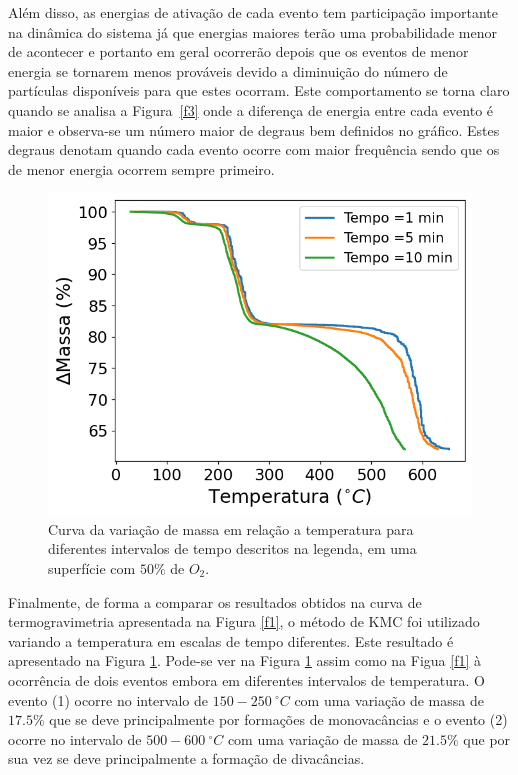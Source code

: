 \documentclass[12pt]{elsarticle}
\begin{document}
Além disso, as energias de ativação de cada evento tem participação importante na dinâmica do sistema já que energias maiores terão uma probabilidade menor de acontecer e portanto em geral ocorrerão depois que os eventos de menor energia se tornarem menos prováveis devido a diminuição do número de partículas disponíveis para que estes ocorram. Este comportamento se torna claro quando se analisa a Figura~\ref{f3} onde a diferença de energia entre cada evento é maior e observa-se um número maior de degraus bem definidos no gráfico. Estes degraus denotam quando cada evento ocorre com maior frequência sendo que os de menor energia ocorrem sempre primeiro. 

\begin{figure}[!htbp]
\centering\includegraphics[scale=0.6]{figures/Temperatura-massa.png}
\caption{Curva da variação de massa em relação a temperatura para diferentes intervalos de tempo descritos na legenda, em uma superfície com $50\%$ de $O_2$.}
\label{f4}
\end{figure}


Finalmente, de forma a comparar os resultados obtidos na curva de termogravimetria apresentada na Figura \ref{f1}, o método de KMC foi utilizado variando a temperatura em escalas de tempo diferentes. Este resultado é apresentado na Figura \ref{f4}. Pode-se ver na Figura \ref{f4} assim como na Figua \ref{f1} à ocorrência de dois eventos embora em diferentes intervalos de temperatura. O evento (1) ocorre no intervalo de $150-250~^\circ C$ com uma variação de massa de $17.5\%$ que se deve principalmente por formações de monovacâncias e o evento (2) ocorre no intervalo de  $500-600~^\circ C$ com uma variação de massa de $21.5\%$ que por sua vez se deve principalmente a formação de divacâncias. 
\end{document}
